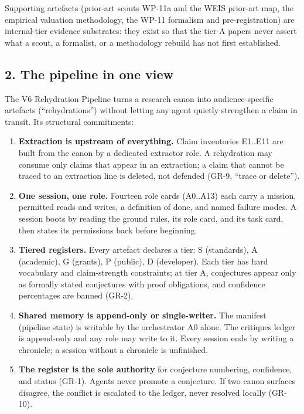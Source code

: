 \documentclass[
  11pt,
]{article}
\providecommand{\tightlist}{%
  \setlength{\itemsep}{0pt}\setlength{\parskip}{0pt}}
\begin{document}
Supporting artefacts (prior-art scouts WP-11a and the WEIS prior-art
map, the empirical valuation methodology, the WP-11 formalism and
pre-registration) are internal-tier evidence substrates: they exist so
that the tier-A papers never assert what a scout, a formalist, or a
methodology rebuild has not first established.

\subsection{2. The pipeline in one view}\label{the-pipeline-in-one-view}

The V6 Rehydration Pipeline turns a research canon into
audience-specific artefacts (``rehydrations'') without letting any agent
quietly strengthen a claim in transit. Its structural commitments:

\begin{enumerate}
\def\labelenumi{\arabic{enumi}.}
\tightlist
\item
  \textbf{Extraction is upstream of everything.} Claim inventories
  E1..E11 are built from the canon by a dedicated extractor role. A
  rehydration may consume only claims that appear in an extraction; a
  claim that cannot be traced to an extraction line is deleted, not
  defended (GR-9, ``trace or delete'').
\item
  \textbf{One session, one role.} Fourteen role cards (A0..A13) each
  carry a mission, permitted reads and writes, a definition of done, and
  named failure modes. A session boots by reading the ground rules, its
  role card, and its task card, then states its permissions back before
  beginning.
\item
  \textbf{Tiered registers.} Every artefact declares a tier: S
  (standards), A (academic), G (grants), P (public), D (developer). Each
  tier has hard vocabulary and claim-strength constraints; at tier A,
  conjectures appear only as formally stated conjectures with proof
  obligations, and confidence percentages are banned (GR-2).
\item
  \textbf{Shared memory is append-only or single-writer.} The manifest
  (pipeline state) is writable by the orchestrator A0 alone. The
  critiques ledger is append-only and any role may write to it. Every
  session ends by writing a chronicle; a session without a chronicle is
  unfinished.
\item
  \textbf{The register is the sole authority} for conjecture numbering,
  confidence, and status (GR-1). Agents never promote a conjecture. If
  two canon surfaces disagree, the conflict is escalated to the ledger,
  never resolved locally (GR-10).
\end{enumerate}
\end{document}
